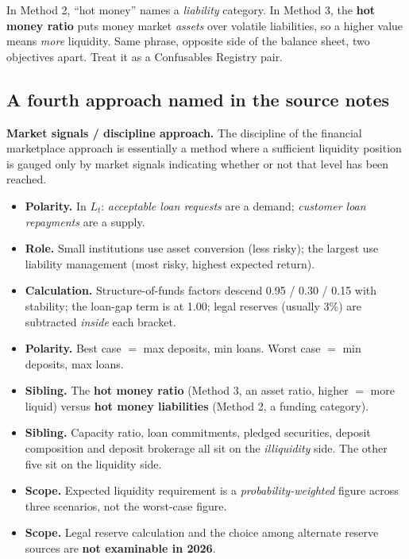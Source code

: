 \begin{lrtrapbox}
In Method 2, ``hot money'' names a \emph{liability} category. In Method 3, the \textbf{hot money ratio} puts money market \emph{assets} over volatile liabilities, so a higher value means \emph{more} liquidity. Same phrase, opposite side of the balance sheet, two objectives apart. Treat it as a Confusables Registry pair.
\end{lrtrapbox}

\subsection{A fourth approach named in the source notes}


\textbf{Market signals / discipline approach.} The discipline of the financial marketplace approach is essentially a method where a sufficient liquidity position is gauged only by market signals indicating whether or not that level has been reached.

\begin{lrtrapbox}
\begin{itemize}
\item \textbf{Polarity.} In $L_t$: \emph{acceptable loan requests} are a demand; \emph{customer loan repayments} are a supply.
\item \textbf{Role.} Small institutions use asset conversion (less risky); the largest use liability management (most risky, highest expected return).
\item \textbf{Calculation.} Structure-of-funds factors descend 0.95 / 0.30 / 0.15 with stability; the loan-gap term is at 1.00; legal reserves (usually 3\%) are subtracted \emph{inside} each bracket.
\item \textbf{Polarity.} Best case $=$ max deposits, min loans. Worst case $=$ min deposits, max loans.
\item \textbf{Sibling.} The \textbf{hot money ratio} (Method 3, an asset ratio, higher $=$ more liquid) versus \textbf{hot money liabilities} (Method 2, a funding category).
\item \textbf{Sibling.} Capacity ratio, loan commitments, pledged securities, deposit composition and deposit brokerage all sit on the \emph{illiquidity} side. The other five sit on the liquidity side.
\item \textbf{Scope.} Expected liquidity requirement is a \emph{probability-weighted} figure across three scenarios, not the worst-case figure.
\item \textbf{Scope.} Legal reserve calculation and the choice among alternate reserve sources are \textbf{not examinable in 2026}.
\end{itemize}
\end{lrtrapbox}
